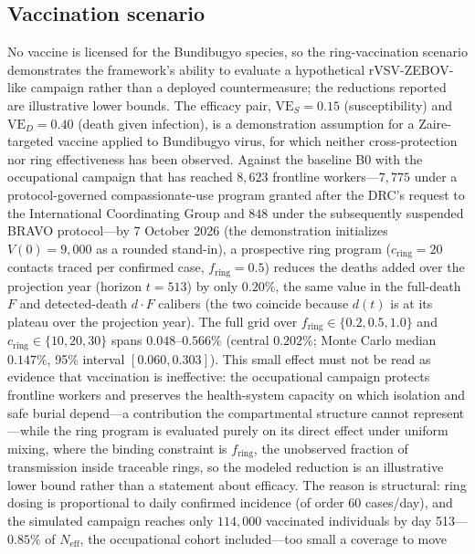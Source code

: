 \documentclass[10pt]{plos}
\begin{document}
\subsection{Vaccination scenario}\label{sec:vacc}

No vaccine is licensed for the Bundibugyo species, so the
ring-vaccination scenario demonstrates the framework's ability to
evaluate a hypothetical rVSV-ZEBOV-like campaign rather than a deployed
countermeasure; the reductions reported are illustrative lower bounds.
The efficacy pair, $\mathrm{VE}_S=0.15$ (susceptibility) and
$\mathrm{VE}_D=0.40$ (death given infection), is a demonstration
assumption for a Zaire-targeted vaccine applied to Bundibugyo virus, for
which neither cross-protection nor ring effectiveness has been observed.
Against the baseline B0 with the occupational campaign that has reached
$8{,}623$ frontline workers---$7{,}775$ under a protocol-governed
compassionate-use program granted after the DRC's request to the
International Coordinating Group  and $848$ under
the subsequently suspended BRAVO protocol---by 7
October 2026 (the demonstration initializes $V(0)=9{,}000$ as a rounded
stand-in), a prospective ring program ($c_{\mathrm{ring}}=20$ contacts
traced per confirmed case, $f_{\mathrm{ring}}=0.5$) reduces the deaths
added over the projection year (horizon $t=513$) by only $0.20\%$, the
same value in the full-death $F$ and detected-death $d\cdot F$ calibers
(the two coincide because $d(t)$ is at its plateau over the projection
year). The full grid over
$f_{\mathrm{ring}}\in\{0.2,0.5,1.0\}$ and
$c_{\mathrm{ring}}\in\{10,20,30\}$ spans $0.048$--$0.566\%$ (central
$0.202\%$; Monte Carlo median $0.147\%$, 95\% interval $[0.060,0.303]$).
This small effect must not be
read as evidence that vaccination is ineffective: the occupational
campaign protects frontline workers and preserves the health-system
capacity on which isolation and safe burial depend---a contribution the
compartmental structure cannot represent---while the ring program is
evaluated purely on its direct effect under uniform mixing, where the
binding constraint is $f_{\mathrm{ring}}$, the unobserved fraction of
transmission inside traceable rings, so the modeled reduction is an
illustrative lower bound rather than a statement about efficacy. The
reason is structural: ring dosing is proportional to daily confirmed
incidence (of order 60 cases/day), and the simulated campaign reaches
only $114{,}000$ vaccinated individuals by day 513---$0.85\%$ of
$N_{\mathrm{eff}}$, the occupational cohort included---too small a
coverage to move
\end{document}
